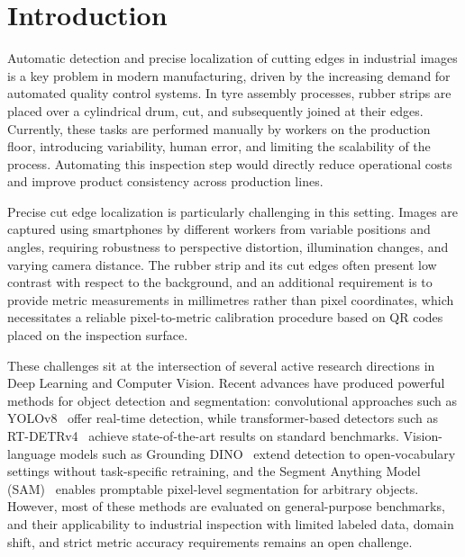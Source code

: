 \documentclass[11pt]{article}
\begin{document}

\section{Introduction}
\label{sec:introduction}

Automatic detection and precise localization of cutting edges in industrial images 
is a key problem in modern manufacturing, driven by the increasing demand for 
automated quality control systems. In tyre assembly processes, rubber strips are 
placed over a cylindrical drum, cut, and subsequently joined at their edges. 
Currently, these tasks are performed manually by workers on the production floor, 
introducing variability, human error, and limiting the scalability of the process. 
Automating this inspection step would directly reduce operational costs and improve 
product consistency across production lines.

Precise cut edge localization is particularly challenging in this setting. Images 
are captured using smartphones by different workers from variable positions and 
angles, requiring robustness to perspective distortion, illumination changes, and 
varying camera distance. The rubber strip and its cut edges often present low 
contrast with respect to the background, and an additional requirement is to provide 
metric measurements in millimetres rather than pixel coordinates, which necessitates 
a reliable pixel-to-metric calibration procedure based on QR codes placed on the 
inspection surface.

These challenges sit at the intersection of several active research directions in 
Deep Learning and Computer Vision. Recent advances have produced powerful methods 
for object detection and segmentation: convolutional approaches such as 
YOLOv8~\cite{Jocher2023YOLOv8} offer real-time detection, while transformer-based 
detectors such as RT-DETRv4~\cite{LiaoRTDETRv4} achieve state-of-the-art results 
on standard benchmarks. Vision-language models such as Grounding 
DINO~\cite{RenGroundedSAM2024} extend detection to open-vocabulary settings without 
task-specific retraining, and the Segment Anything Model 
(SAM)~\cite{KirillovSAM2023} enables promptable pixel-level segmentation for 
arbitrary objects. However, most of these methods are evaluated on general-purpose 
benchmarks, and their applicability to industrial inspection with limited labeled 
data, domain shift, and strict metric accuracy requirements remains an open 
challenge.
\end{document}
